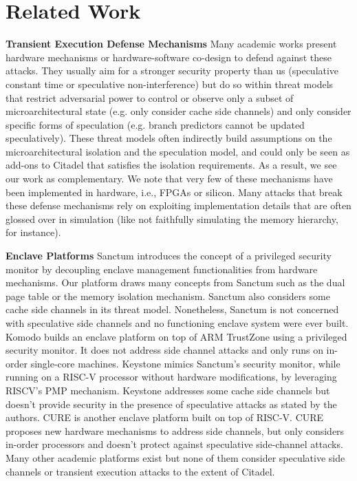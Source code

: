 \section{Related Work}
\textbf{Transient Execution Defense Mechanisms}
Many academic works \cite{ainsworth2020muontrap, cheang2019formal, canella2019systematic, barber2019specshield, fustos2019spectreguard, yan2018invisispec, yu2019speculative, saileshwar2019cleanupspec, weisse2019nda, khasawneh2019safespec, loughlin2021dolma, ainsworth2021ghostminion} present hardware mechanisms or hardware-software co-design to defend against these attacks.
They usually aim for a stronger security property than us (speculative constant time or speculative non-interference) but do so within threat models that restrict adversarial power to control or observe only a subset of microarchitectural state (e.g. only consider cache side channels) and only consider specific forms of speculation (e.g. branch predictors cannot be updated speculatively).
These threat models often indirectly build assumptions on the microarchitectural isolation and the speculation model, and could only be seen as add-ons to Citadel that satisfies the isolation requirements.
As a result, we see our work as complementary. We note that very few of these mechanisms have been implemented in hardware, i.e., FPGAs or silicon.
Many attacks that break these defense mechanisms rely on exploiting implementation details that are often glossed over in simulation (like not faithfully simulating the memory hierarchy, for instance).

\noindent\textbf{Enclave Platforms}
Sanctum \cite{costan2016sanctum} introduces the concept of a privileged security monitor by decoupling enclave management functionalities from hardware mechanisms. 
Our platform draws many concepts from Sanctum such as the dual page table or the memory isolation mechanism. Sanctum also considers some cache side channels in its threat model.
Nonetheless, Sanctum is not concerned with speculative side channels and no functioning enclave system were ever built.
Komodo \cite{ferraiuolo2017komodo} builds an enclave platform on top of ARM TrustZone \cite{trustzone04} using a privileged security monitor.
It does not address side channel attacks and only runs on in-order single-core machines.
Keystone \cite{lee2020keystone} mimics Sanctum's security monitor, while running on a RISC-V processor without hardware modifications, by leveraging RISCV's PMP mechanism.
Keystone addresses some cache side channels but doesn't provide security in the presence of speculative attacks as stated by the authors.
CURE \cite{bahmani2021cure} is another enclave platform built on top of RISC-V. 
CURE proposes new hardware mechanisms to address side channels, but only considers in-order processors and doesn't protect against speculative side-channel attacks.
Many other academic platforms exist \cite{feng2021scalable, weiser2019timber, mccune2008flicker, azab2011sice, xia2013architecture, deng2014equalvisor, brasser2019sanctuary, sun2015trustice, koeberl2014trustlite, aegis, xom} but none of them consider speculative side channels or transient execution attacks to the extent of Citadel. 

